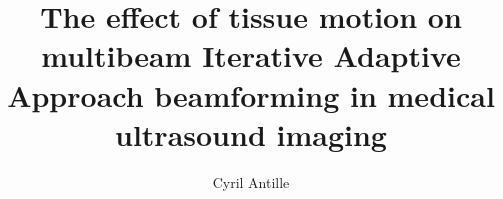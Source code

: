 \documentclass[a4paper,UKenglish]{modules/ifimaster}
\author{Cyril Antille}
\title{The effect of tissue motion on multibeam Iterative Adaptive Approach beamforming in medical ultrasound imaging}
\begin{document}
    \masterfrontpage
    \frontmatter{}
    
    
    
    \tableofcontents{}
    \listoffigures{}
    \listoftables{}
    
    \mainmatter{}
    
    
    
    
    
    
    
    
    
    
    \backmatter{}
    
\end{document}
